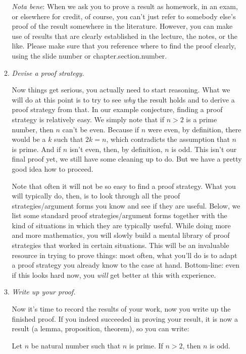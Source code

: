 \begin{enumerate}[{\thesection}.1]
\begin{enumerate}[\thesection.{7}.1]
				 
				 \emph{Nota bene}: When we ask you to prove a result as homework, in an exam, or elsewhere for credit, of course, you can't just refer to somebody else's proof of the result somewhere in the literature. However, you can make use of results that are clearly established in the lecture, the notes, or the like. Please make sure that you reference where to find the proof clearly, using the slide number or chapter.section.number. 
				 
				 			
			\item \emph{Devise a proof strategy.}
			
				Now things get serious, you actually need to start reasoning. What we will do at this point is to try to see \emph{why} the result holds and to derive a proof strategy from that. In our example conjecture, finding a proof strategy is relatively easy. We simply note that if $n>2$ is a prime number, then $n$ can't be even. Because if $n$ were even, by definition, there would be a $k$ such that $2k=n$, which contradicts the assumption that $n$ is prime. And if $n$ isn't even, then, by definition, $n$ is odd. This isn't our final proof yet, we still have some cleaning up to do. But we have a pretty good idea how to proceed.
				
				\vspace{1ex}
				
				Note that often it will not be so easy to find a proof strategy. What you will typically do, then, is to look through all the proof strategies/argument forms you know and see if they are useful. Below, we list some standard proof strategies/argument forms together with the kind of situations in which they are typically useful. While doing more and more mathematics, you will slowly build a mental library of proof strategies that worked in certain situations. This will be an invaluable resource in trying to prove things: most often, what you'll do is to adapt a proof strategy you already know to the case at hand. Bottom-line: even if this looks hard now, you \emph{will} get better at this with experience.
				
			
			\item \emph{Write up your proof.}
			
				Now it's time to record the results of your work, now you write up the finished proof. If you indeed succeeded in proving your result, it is now a result (a lemma, proposition, theorem), so you can write:
				
				\begin{proposition}
				Let $n$ be natural number such that $n$ is prime. If $n>2$, then $n$ is odd.
				\end{proposition}
				

\end{enumerate}
\end{enumerate}
